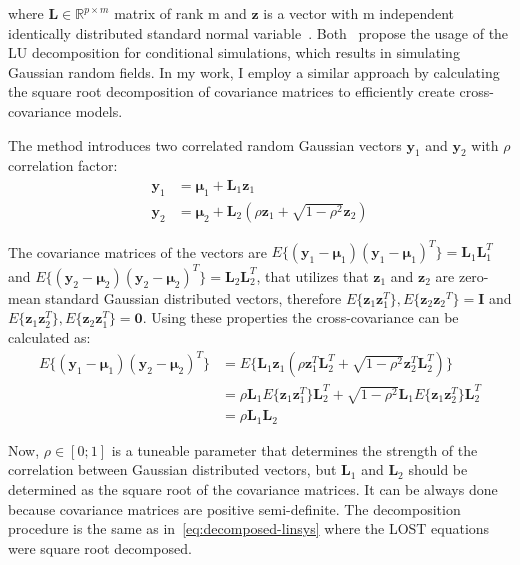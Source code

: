 where $\mathbf{L}\in\mathbb{R}^{p\times m}$ matrix of rank m and $\mathbf{z}$ is a vector with m independent identically distributed standard normal variable~\cite{rao}. Both~\cite{Alabert1987, Davis1987} propose the usage of the LU decomposition for conditional simulations, which results in simulating Gaussian random fields. In my work, I employ a similar approach by calculating the square root decomposition of covariance matrices to efficiently create cross-covariance models.

The method introduces two correlated random Gaussian vectors $\mathbf{y}_1$ and $\mathbf{y}_2$ with $\rho$ correlation factor:
\begin{equation}
\begin{aligned}
    \mathbf{y}_1 &= \boldsymbol{\mu}_1+\mathbf{L}_1\mathbf{z}_1 \\
    \mathbf{y}_2 &= \boldsymbol{\mu}_2+\mathbf{L}_2\left(\rho\mathbf{z}_1+\sqrt{1-\rho^2}\mathbf{z}_2\right)
\end{aligned}
\end{equation}

The covariance matrices of the vectors are $E\{(\mathbf{y}_1-\boldsymbol{\mu}_1){(\mathbf{y}_1-\boldsymbol{\mu}_1)}^T\}=\mathbf{L}_1\mathbf{L}_1^T$ and $E\{(\mathbf{y}_2-\boldsymbol{\mu}_2){(\mathbf{y}_2-\boldsymbol{\mu}_2)}^T\}=\mathbf{L}_2\mathbf{L}_2^T$, that utilizes that $\mathbf{z}_1$ and $\mathbf{z}_2$ are zero-mean standard Gaussian distributed vectors, therefore $E\{\mathbf{z}_1\mathbf{z}_1^T\}, E\{\mathbf{z}_2{\mathbf{z}_2}^T\}=\mathbf{I}$ and $E\{\mathbf{z}_1\mathbf{z}_2^T\}, E\{\mathbf{z}_2\mathbf{z}_1^T\}=\mathbf{0}$. Using these properties the cross-covariance can be calculated as:
\begin{equation}
\begin{aligned}    
    E\{(\mathbf{y}_1-\boldsymbol{\mu}_1){(\mathbf{y}_2-\boldsymbol{\mu}_2)}^T\}&=E\{\mathbf{L}_1\mathbf{z}_1(\rho\mathbf{z}_1^T\mathbf{L}_2^T+\sqrt{1-\rho^2}\mathbf{z}_2^T\mathbf{L}_2^T)\} \\ &=
    \rho\mathbf{L}_1 E\{\mathbf{z}_1\mathbf{z}_1^T\}\mathbf{L}_2^T+\sqrt{1-\rho^2}\mathbf{L}_1E\{\mathbf{z}_1\mathbf{z}_2^T\}\mathbf{L}_2^T \\ &=
    \rho\mathbf{L}_1\mathbf{L}_2
\end{aligned}
\end{equation}

Now, $\rho\in[0;1]$ is a tuneable parameter that determines the strength of the correlation between Gaussian distributed vectors, but $\mathbf{L}_1$ and $\mathbf{L}_2$ should be determined as the square root of the covariance matrices. It can be always done because covariance matrices are positive semi-definite. The decomposition procedure is the same as in~\eqref{eq:decomposed-linsys} where the LOST equations were square root decomposed.

